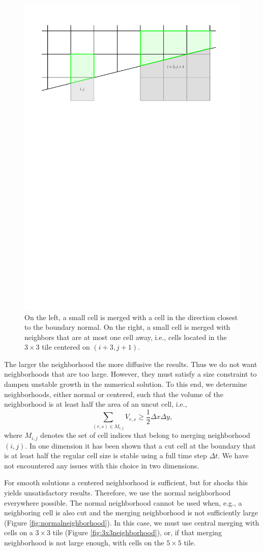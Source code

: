 \begin{figure}[h]
    \centering
    \includegraphics[width=0.5\linewidth]{figs/neighborhoods.pdf}
    \caption{\sf On the left, a small cell is merged with a cell in the direction closest to the 
    	boundary normal.  On the right, a small cell is merged with neighbors that are at most one cell away, i.e., cells located in the $3\times3$ tile centered on $(i+3,j+1)$.}
    \label{fig:neighborhoods}
\end{figure}

The larger the neighborhood the more diffusive the results. Thus we do not want neighborhoods that 
are too large.  However, they must satisfy a size constraint to dampen unstable growth in the numerical 
solution. To this end, we determine neighborhoods, either normal or centered, such that the
volume of the neighborhood is at least half the area of an uncut cell, i.e., 
\begin{equation} \label{eqn:vmerge}
\sum_{(r,s) \in M_{i,j}} V_{r,s} \geq \frac{1}{2}\Delta x \Delta y,
\end{equation}
where $M_{i,j}$ denotes the set of cell indices that belong to 
merging neighborhood $(i,j)$.    
In one dimension it has been shown \cite{mjb:stability2} that a cut cell at the boundary 
that is at least half the regular cell size  is stable using a full time step $\Delta t$.  
We have not encountered any issues with this choice in two dimensions.

For smooth solutions a centered neighborhood is sufficient, but for shocks this yields unsatisfactory results. Therefore, we use the normal neighborhood everywhere possible.
The normal neighborhood cannot be used when, e.g., a neighboring cell is also cut and the
merging neighborhood is not sufficiently large (Figure \ref{fig:normalneighborhood}).  In this case, we must use central merging with cells on a $3\times3$ tile (Figure \ref{fig:3x3neighborhood}), or, if that merging neighborhood is not large enough, with cells on the $5 \times 5$ tile.




